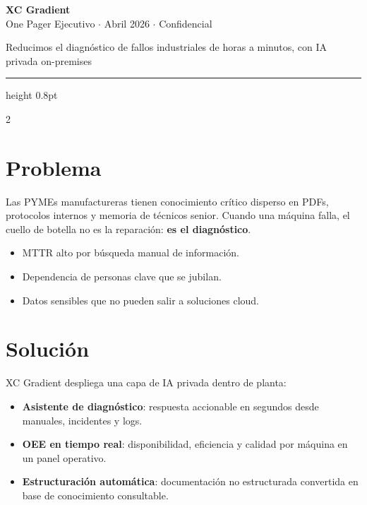 \documentclass[10pt,a4paper]{article}
\begin{document}
\begin{center}
{\LARGE\bfseries\color{dark} XC Gradient}\\[0.1em]
{\small\color{midgray} One Pager Ejecutivo $\cdot$ Abril 2026 $\cdot$ Confidencial}\\[0.35em]
\colorbox{accent}{\color{white}\small\bfseries\strut\quad Reducimos el diagn\'ostico de fallos industriales de horas a minutos, con IA privada on-premises \quad}
\end{center}

\vspace{0.25em}
{\color{accent}\hrule height 0.8pt}
\vspace{0.35em}

\begin{multicols}{2}

\section{Problema}
Las PYMEs manufactureras tienen conocimiento cr\'itico disperso en PDFs, protocolos internos y memoria de t\'ecnicos senior. Cuando una m\'aquina falla, el cuello de botella no es la reparaci\'on: \textbf{es el diagn\'ostico}.

\begin{itemize}[leftmargin=1em,itemsep=1pt,topsep=2pt]
\item MTTR alto por b\'usqueda manual de informaci\'on.
\item Dependencia de personas clave que se jubilan.
\item Datos sensibles que no pueden salir a soluciones cloud.
\end{itemize}

\section{Soluci\'on}
XC Gradient despliega una capa de IA privada dentro de planta:
\begin{itemize}[leftmargin=1em,itemsep=1pt,topsep=2pt]
\item \textbf{Asistente de diagn\'ostico}: respuesta accionable en segundos desde manuales, incidentes y logs.
\item \textbf{OEE en tiempo real}: disponibilidad, eficiencia y calidad por m\'aquina en un panel operativo.
\item \textbf{Estructuraci\'on autom\'atica}: documentaci\'on no estructurada convertida en base de conocimiento consultable.
\end{itemize}


\end{multicols}
\end{document}
